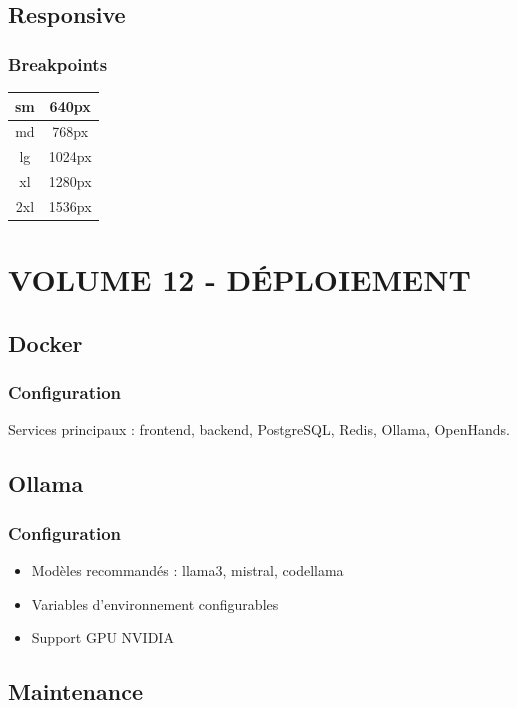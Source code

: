 \documentclass[12pt,a4paper,oneside]{book}
\begin{document}
\chapter{Responsive}

\section{Breakpoints}
\begin{center}
\begin{tabular}{|c|c|}
\hline
sm & 640px \\
\hline
md & 768px \\
\hline
lg & 1024px \\
\hline
xl & 1280px \\
\hline
2xl & 1536px \\
\hline
\end{tabular}
\end{center}

\part{VOLUME 12 - DÉPLOIEMENT}

\chapter{Docker}

\section{Configuration}
Services principaux : frontend, backend, PostgreSQL, Redis, Ollama, OpenHands.

\chapter{Ollama}

\section{Configuration}
\begin{itemize}
\item Modèles recommandés : llama3, mistral, codellama
\item Variables d'environnement configurables
\item Support GPU NVIDIA
\end{itemize}

\chapter{Maintenance}
\end{document}
